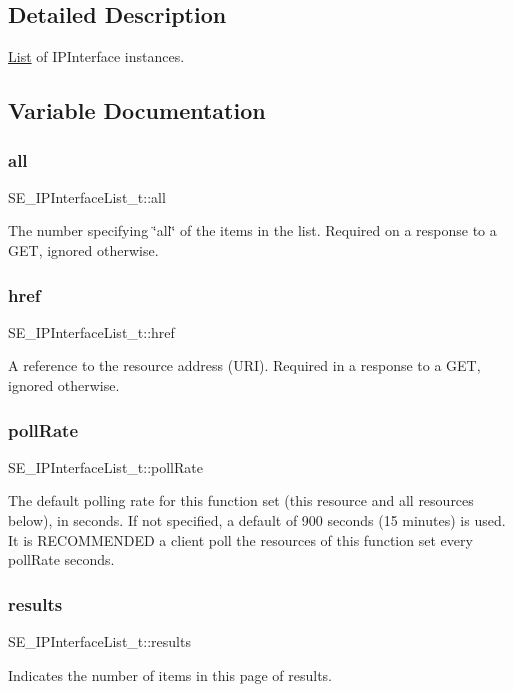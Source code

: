 \subsection{Detailed Description}
\hyperlink{structList}{List} of I\+P\+Interface instances. 

\subsection{Variable Documentation}
\mbox{\label{group__IPInterfaceList_ga7599acc849916884bf2ab40af9644c87}} 
\subsubsection{\texorpdfstring{all}{all}}
{\footnotesize\ttfamily S\+E\+\_\+\+I\+P\+Interface\+List\+\_\+t\+::all}

The number specifying \char`\"{}all\char`\"{} of the items in the list. Required on a response to a G\+ET, ignored otherwise. \mbox{\label{group__IPInterfaceList_ga8d2aa9f5037c9e3dd1c5f57574f18623}} 
\subsubsection{\texorpdfstring{href}{href}}
{\footnotesize\ttfamily S\+E\+\_\+\+I\+P\+Interface\+List\+\_\+t\+::href}

A reference to the resource address (U\+RI). Required in a response to a G\+ET, ignored otherwise. \mbox{\label{group__IPInterfaceList_gacffb60f8d3c1549c12714eb33d91d745}} 
\subsubsection{\texorpdfstring{poll\+Rate}{pollRate}}
{\footnotesize\ttfamily S\+E\+\_\+\+I\+P\+Interface\+List\+\_\+t\+::poll\+Rate}

The default polling rate for this function set (this resource and all resources below), in seconds. If not specified, a default of 900 seconds (15 minutes) is used. It is R\+E\+C\+O\+M\+M\+E\+N\+D\+ED a client poll the resources of this function set every poll\+Rate seconds. \mbox{\label{group__IPInterfaceList_ga4ef447fb08fb976a9d26d9764d111abb}} 
\subsubsection{\texorpdfstring{results}{results}}
{\footnotesize\ttfamily S\+E\+\_\+\+I\+P\+Interface\+List\+\_\+t\+::results}

Indicates the number of items in this page of results. 